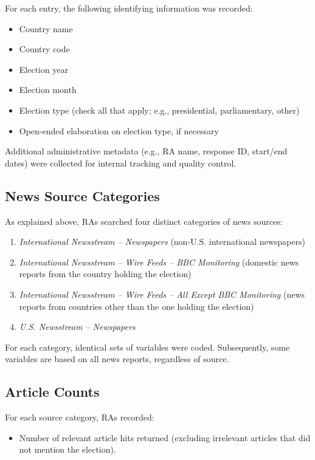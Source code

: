 \documentclass[USletter,12pt, titlepage]{article} %
\begin{document}
For each entry, the following identifying information was recorded:

\begin{itemize}
    \item Country name
    \item Country code
    \item Election year
    \item Election month
    \item Election type (check all that apply; e.g., presidential, parliamentary, other)
    \item Open-ended elaboration on election type, if necessary
\end{itemize}

Additional administrative metadata (e.g., RA name, response ID, start/end dates) were collected for internal tracking and quality control.

\subsection{News Source Categories}

As explained above, RAs searched four distinct categories of news sources:

\begin{enumerate}
    \item \textit{International Newsstream -- Newspapers} (non-U.S. international newspapers)
    \item \textit{International Newsstream -- Wire Feeds -- BBC Monitoring} (domestic news reports from the country holding the election)
    \item \textit{International Newsstream -- Wire Feeds -- All Except BBC Monitoring} (news reports from countries other than the one holding the election)
    \item \textit{U.S. Newsstream -- Newspapers}
\end{enumerate}

For each category, identical sets of variables were coded. Subsequently, some variables are based on all news reports, regardless of source. 

\subsection{Article Counts}

For each source category, RAs recorded:

\begin{itemize}
    \item Number of relevant article hits returned (excluding irrelevant articles that did not mention the election).
\end{itemize}
\end{document}
